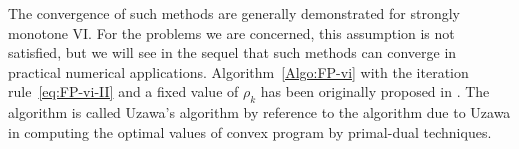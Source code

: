 The convergence of such methods are generally demonstrated for strongly monotone VI. For the problems we are concerned, this assumption is not satisfied, but we will see in the sequel that such methods can converge in practical numerical applications. 
Algorithm~\ref{Algo:FP-vi} with the iteration rule~\eqref{eq:FP-vi-II} and a fixed value of $\rho_k$ has been originally proposed in \cite{DeSaxce.Feng1998}. The algorithm is called Uzawa's algorithm by reference to the algorithm due to Uzawa in computing the optimal values of convex program by primal-dual techniques.




